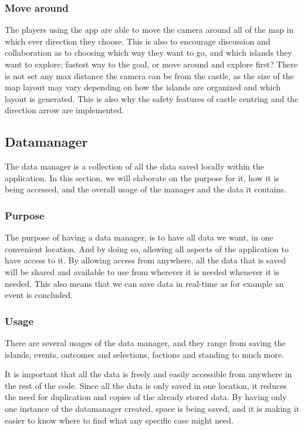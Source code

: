 	
\subsubsection{Move around}

The players using the app are able to move the camera around all of the map in which ever direction they choose. This is also to encourage discussion and collaboration as to choosing which way they want to go, and which islands they want to explore; fastest way to the goal, or move around and explore first?
There is not set any max distance the camera can be from the castle, as the size of the map layout may vary depending on how the islands are organized and which layout is generated. This is also why the safety features of castle centring and the direction arrow are implemented.

\subsection{Datamanager}

The data manager is a collection of all the data saved locally within the application. In this section, we will elaborate on the purpose for it, how it is being accessed, and the overall usage of the manager and the data it contains.

\subsubsection{Purpose}
	
The purpose of having a data manager, is to have all data we want, in one convenient location. And by doing so, allowing all aspects of the application to have access to it. By allowing access from anywhere, all the data that is saved will be shared and available to use from wherever it is needed whenever it is needed. This also means that we can save data in real-time as for example an event is concluded.

\subsubsection{Usage}

There are several usages of the data manager, and they range from saving the islands, events, outcomes and selections, factions and standing to much more.

It is important that all the data is freely and easily accessible from anywhere in the rest of the code. Since all the data is only saved in one location, it reduces the need for duplication and copies of the already stored data. By having only one instance of the datamanager created, space is being saved, and it is making it easier to know where to find what any specific case might need.


